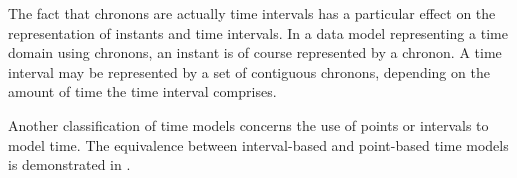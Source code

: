 The fact that chronons are actually time intervals has a particular effect on the representation of instants and time intervals. In a data model representing a time domain using chronons, an instant is of course represented by a chronon. A time interval may be represented by a set of contiguous chronons, depending on the amount of time the time interval comprises.



Another classification of time models concerns the use of points or intervals to model time. The equivalence between interval-based and point-based time models is demonstrated in \cite{Böhlen_point-versus}.




